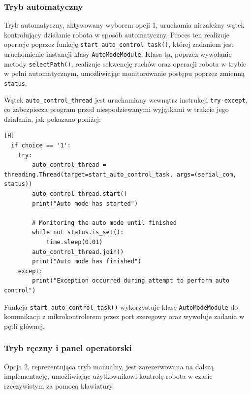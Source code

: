 \subsubsection{Tryb automatyczny}

Tryb automatyczny, aktywowany wyborem opcji 1, uruchamia niezależny wątek kontrolujący działanie robota w sposób automatyczny. Proces ten realizuje operacje poprzez funkcję \texttt{start\_auto\_control\_task()}, której zadaniem jest uruchomienie instancji klasy \texttt{AutoModeModule}. Klasa ta, poprzez wywołanie metody \texttt{selectPath()}, realizuje sekwencję ruchów oraz operacji robota w trybie w pełni automatycznym, umożliwiając monitorowanie postępu poprzez zmienną \texttt{status}.

Wątek \texttt{auto\_control\_thread} jest uruchamiany wewnątrz instrukcji \texttt{try-except}, co zabezpiecza program przed niespodziewanymi wyjątkami w trakcie jego działania, jak pokazano poniżej:

\vspace*{0.5cm}


\begin{lstlisting}[caption=Wybór i uruchomienie trybu automatycznego,   label=fig:automode_choice, captionpos=b][H]
  if choice == '1':
    try:
        auto_control_thread = threading.Thread(target=start_auto_control_task, args=(serial_com, status))
        auto_control_thread.start()
        print("Auto mode has started")

        # Monitoring the auto mode until finished
        while not status.is_set():
            time.sleep(0.01)
        auto_control_thread.join()
        print("Auto mode has finished")
    except:
        print("Exception occurred during attempt to perform auto control")
\end{lstlisting}

\vspace*{0.5cm}


Funkcja \texttt{start\_auto\_control\_task()} wykorzystuje klasę \texttt{AutoModeModule} do komunikacji z mikrokontrolerem przez port szeregowy oraz wywołuje zadania w pętli głównej.

\subsubsection{Tryb ręczny i panel operatorski}

Opcja 2, reprezentująca tryb manualny, jest zarezerwowana na dalszą implementację, umożliwiając użytkownikowi kontrolę robota w czasie rzeczywistym za pomocą klawiatury.

